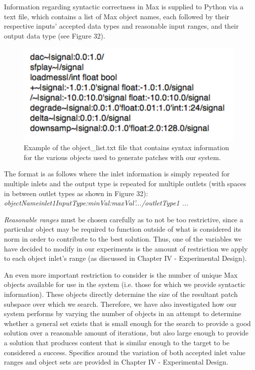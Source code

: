 \documentclass[12pt]{report} 	%
\numberwithin{figure}{chapter}
\numberwithin{table}{chapter}
\numberwithin{equation}{chapter}
\begin{document}
\begin{flushleft}
Information regarding syntactic correctness in Max is supplied to Python via a text file, which contains a list of Max object names, each followed by their respective inputs' accepted data types and reasonable input ranges, and their output data type (see Figure 32).
\begin{figure}[h!]
\begin{center}
\includegraphics[scale=0.8]{SyntaxInfo}
\caption[Object list file]{Example of the object\_list.txt file that contains syntax information for the various objects used to generate patches with our system.}
\end{center}
\end{figure}

The format is as follows where the inlet information is simply repeated for multiple inlets and the output type is repeated for multiple outlets (with spaces in between outlet types as shown in Figure 32):
\\
{\textit{objectName\textbar inlet1InputType:minVal:maxVal'.../outletType1 ...}}

\textit{Reasonable ranges} must be chosen carefully as to not be too restrictive, since a particular object may be required to function outside of what is considered its norm in order to contribute to the best solution. Thus, one of the variables we have decided to modify in our experiments is the amount of restriction we apply to each object inlet's range (as discussed in Chapter IV - Experimental Design).

An even more important restriction to consider is the number of unique Max objects available for use in the system (i.e. those for which we provide syntactic information). These objects directly determine the size of the resultant patch subspace over which we search. Therefore, we have also investigated how our system performs by varying the number of objects in an attempt to determine whether a general set exists that is small enough for the search to provide a good solution over a reasonable amount of iterations, but also large enough to provide a solution that produces content that is similar enough to the target to be considered a success. Specifics around the variation of both accepted inlet value ranges and object sets are provided in Chapter IV - Experimental Design.


\end{flushleft}
\end{document}

